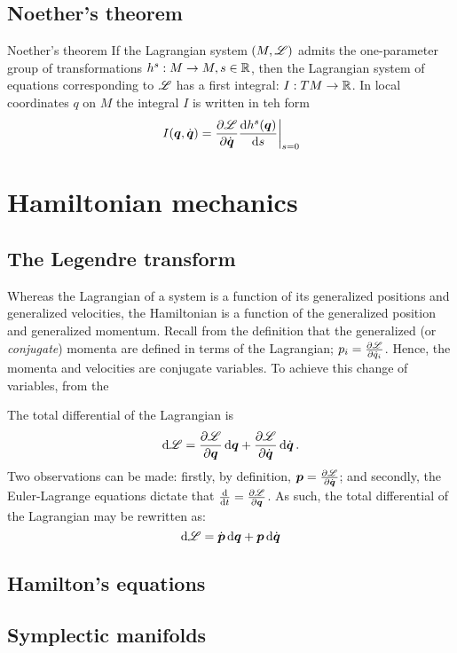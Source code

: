 \subsection{Noether's theorem}

\begin{thmblock}{Noether's theorem}
    If the Lagrangian system $(M, \mathscr{L})$ admits the one-parameter group of transformations $h^s: M \to M, s \in \mathbb{R}$, then the Lagrangian system of equations corresponding to $\mathscr{L}$ has a first integral: $I: TM \to \mathbb{R}$. In local coordinates $q$ on $M$ the integral $I$ is written in teh form 
    $$ \left. I(\vb*{q}, \dot{\vb*{q}}) = \pdv{\ensuremath{\mathscr{L}}}{\ensuremath{\dot{\vb*{q}}}}\dv{h^s(\ensuremath{\vb*{q}})}{s}\right |_{s = 0} $$
\end{thmblock}

\section{Hamiltonian mechanics}

\subsection{The Legendre transform}
Whereas the Lagrangian of a system is a function of its generalized positions and generalized velocities, the Hamiltonian is a function of the generalized position and generalized momentum. Recall from the definition that the generalized (or \emph{conjugate}) momenta are defined in terms of the Lagrangian; $p_i = \pdv{\ensuremath{\mathscr{L}}}{\dot{q}_i}$. Hence, the momenta and velocities are conjugate variables. To achieve this change of variables, from the

The total differential of the Lagrangian is
$$ \dd{\ensuremath{\mathscr{L}}} = \pdv{\ensuremath{\mathscr{L}}}{\ensuremath{\vb*{q}}}\dd{\ensuremath{\vb*{q}}} + \pdv{\ensuremath{\mathscr{L}}}{\ensuremath{\dot{\vb*{q}}}}\dd{\ensuremath{\dot{\vb*{q}}}}. $$
Two observations can be made: firstly, by definition, $\vb*{p} = \pdv{\ensuremath{\mathscr{L}}}{\ensuremath{\dot{\vb*{q}}}}$; and secondly, the Euler-Lagrange equations dictate that $\dv{}{t}(\vb*{p}) = \pdv{\ensuremath{\mathscr{L}}}{\ensuremath{\vb*{q}}}$. As such, the total differential of the Lagrangian may be rewritten as:
$$ \dd{\ensuremath{\mathscr{L}}} = \dot{\vb*{p}}\dd{\ensuremath{\vb*{q}}} + \vb*{p} \dd{\ensuremath{\dot{\vb*{q}}}}$$

\subsection{Hamilton's equations}

\subsection{Symplectic manifolds}

